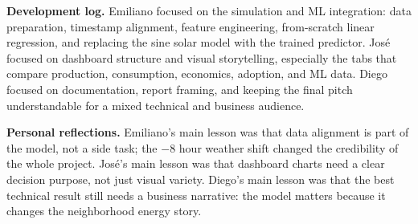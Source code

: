 \documentclass[paper=a4, fontsize=11pt]{scrartcl}
\begin{document}
\textbf{Development log.} Emiliano focused on the simulation and ML integration:
data preparation, timestamp alignment, feature engineering, from-scratch linear
regression, and replacing the sine solar model with the trained predictor.
Jos\'e focused on dashboard structure and visual storytelling, especially the
tabs that compare production, consumption, economics, adoption, and ML data.
Diego focused on documentation, report framing, and keeping the final pitch
understandable for a mixed technical and business audience.

\textbf{Personal reflections.} Emiliano's main lesson was that data alignment
is part of the model, not a side task; the \(-8\) hour weather shift changed
the credibility of the whole project. Jos\'e's main lesson was that dashboard
charts need a clear decision purpose, not just visual variety. Diego's main
lesson was that the best technical result still needs a business narrative:
the model matters because it changes the neighborhood energy story.
\end{document}
